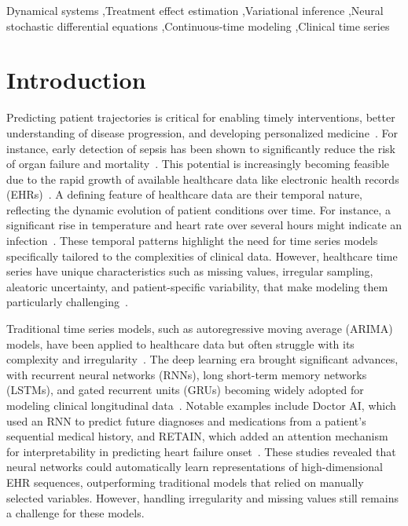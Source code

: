 \documentclass[preprint,12pt]{elsarticle}
\begin{document}
\begin{frontmatter}
\begin{highlights}
\end{highlights}

\begin{keyword}
Dynamical systems \sep Treatment effect estimation \sep Variational inference \sep Neural stochastic differential equations
\sep Continuous-time modeling \sep Clinical time series 


\end{keyword}
\end{frontmatter}

\section{Introduction}
\label{intro}
Predicting patient trajectories is critical for enabling timely interventions, better understanding of disease progression, and developing personalized medicine~\citep{dixon2024unveiling}. For instance, early detection of sepsis has been shown to significantly reduce the risk of organ failure and mortality~\citep{markham2025patient}. 
This potential is increasingly becoming feasible due to the rapid growth of available healthcare data like electronic health records (EHRs)~\citep{yin2023prediction}. 
A defining feature of healthcare data are their temporal nature, reflecting the dynamic evolution of patient conditions over time. For instance, a significant rise in temperature and heart rate over several hours might indicate an infection~\citep{patharkar2024predictive}. These temporal patterns highlight the need for time series models specifically tailored to the complexities of clinical data.
However, healthcare time series have unique characteristics such as missing values, irregular sampling, aleatoric uncertainty, and patient-specific variability, that make modeling them particularly challenging~\citep{noy2023time, liu2016learning}.

Traditional time series models, such as autoregressive moving average (ARIMA) models, have been applied to healthcare data but often struggle with its complexity and irregularity~\citep{morid2023time}. 
The deep learning era brought significant advances, with recurrent neural networks (RNNs), long short-term memory networks (LSTMs), and gated recurrent units (GRUs) becoming widely adopted for modeling clinical longitudinal data~\citep{cascarano2023machine}. Notable examples include Doctor AI, which used an RNN to predict future diagnoses and medications from a patient’s sequential medical history, and RETAIN, which added an attention mechanism for interpretability in predicting heart failure onset~\citep{choi2016doctor,choi2016retain}. These studies revealed that neural networks could automatically learn representations of high-dimensional EHR sequences, outperforming traditional models that relied on manually selected variables. However, handling irregularity and missing values still remains a challenge for these models.
\end{document}
